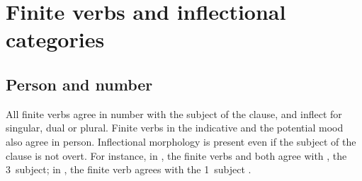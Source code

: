 \section{Finite verbs and inflectional categories}\label{inflectionalCatsVerbs}


\subsection{Person and number}\label{personNumberVerbs}
All finite verbs agree in number with the subject of the clause, and inflect for singular, dual or plural. 
Finite verbs in the indicative and the potential mood also agree in person. %
Inflectional morphology is present even if the subject of the clause is not overt. 
For instance, in , the finite verbs  and  both agree with , the 3\PLs\ subject; in , the finite verb  agrees with the 1\DUs\ subject .


